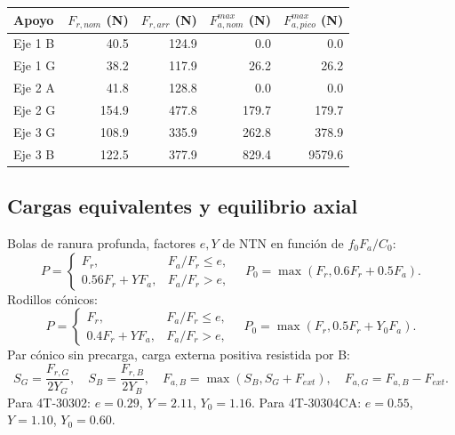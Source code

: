 \documentclass[11pt,a4paper]{article}
\begin{document}
\begin{center}\small\begin{tabular}{lrrrr}\toprule

Apoyo & $F_{r,nom}$ (N) & $F_{r,arr}$ (N) & $F_{a,nom}^{max}$ (N) & $F_{a,pico}^{max}$ (N) \\ \midrule

Eje 1 B & 40.5 & 124.9 & 0.0 & 0.0 \\

Eje 1 G & 38.2 & 117.9 & 26.2 & 26.2 \\

Eje 2 A & 41.8 & 128.8 & 0.0 & 0.0 \\

Eje 2 G & 154.9 & 477.8 & 179.7 & 179.7 \\

Eje 3 G & 108.9 & 335.9 & 262.8 & 378.9 \\

Eje 3 B & 122.5 & 377.9 & 829.4 & 9579.6 \\

\bottomrule\end{tabular}\end{center}

\subsection{Cargas equivalentes y equilibrio axial}
Bolas de ranura profunda, factores $e,Y$ de NTN en función de $f_0F_a/C_0$:
\[
P=\begin{cases}F_r,&F_a/F_r\leq e,\\0.56F_r+YF_a,&F_a/F_r>e,\end{cases}
\quad P_0=\max(F_r,0.6F_r+0.5F_a).
\]
Rodillos cónicos:
\[
P=\begin{cases}F_r,&F_a/F_r\leq e,\\0.4F_r+YF_a,&F_a/F_r>e,\end{cases}
\quad P_0=\max(F_r,0.5F_r+Y_0F_a).
\]
Par cónico sin precarga, carga externa positiva resistida por B:
\[
S_G=\frac{F_{r,G}}{2Y_G},\quad S_B=\frac{F_{r,B}}{2Y_B},\quad
F_{a,B}=\max(S_B,S_G+F_{ext}),\quad F_{a,G}=F_{a,B}-F_{ext}.
\]
Para 4T-30302: $e=0.29$, $Y=2.11$, $Y_0=1.16$. Para 4T-30304CA: $e=0.55$, $Y=1.10$, $Y_0=0.60$.
\end{document}
